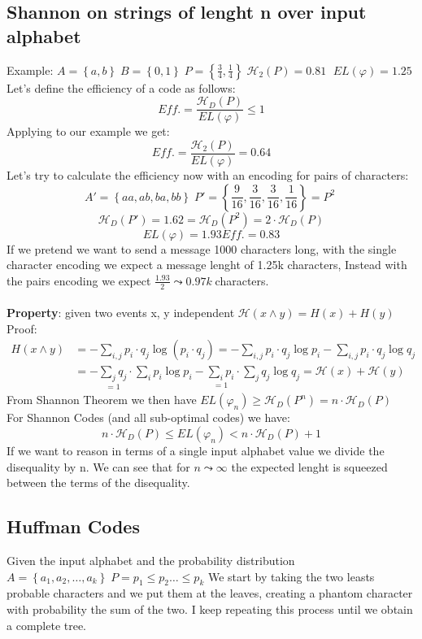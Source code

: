     \subsection*{Shannon on strings of lenght n over input alphabet}
    Example: $A=\left\{ a,b \right\} \;B=\left\{ 0,1 \right\}\; P=\left\{ \frac{3}{4}, \frac{1}{4} \right\}\; \mathcal{H}_2(P)=0.81\;$ 
    $EL(\varphi) = 1.25$\\
    Let's define the efficiency of a code as follows:
    $$Eff. = \frac{\mathcal{H}_D(P)}{EL(\varphi)}\leq 1$$
    Applying to our example we get: 
    $$Eff. = \frac{\mathcal{H}_2(P)}{EL(\varphi)}=0.64$$
    Let's try to calculate the efficiency now with an encoding for pairs of characters:
    $$A'=\left\{ aa, ab,ba,bb \right\}\; P'=\left\{ \frac{9}{16}, \frac{3}{16}, \frac{3}{16}, \frac{1}{16} \right\} = P^2 \;$$ $$
    \mathcal{H}_D(P')= 1.62 = \mathcal{H}_D(P^2) = 2\cdot \mathcal{H}_D(P)$$
    $$EL(\varphi) = 1.93 Eff. = 0.83$$
    If we pretend we want to send a message 1000 characters long, with the single character encoding we expect a message lenght of 1.25k characters,
    Instead with the pairs encoding we expect $\frac{1.93}{2} \leadsto 0.97k \;$characters.\\\\
    \textbf{Property}: given two events x, y independent
    $\mathcal{H}(x \wedge y) = H(x) + H(y)$
    Proof:
    \begin{align*}
        H(x \wedge y ) &= -\sum_{i,j}^{}{p_i \cdot q_j \log{(p_i\cdot q_j)}} = - \sum_{i,j}^{}{p_i \cdot q_j \log{p_i}} - \sum_{i,j}^{}{p_i\cdot q_j \log{q_j}}\\
        &= -\underset{=1}{\sum_{j}{q_j}} \cdot \sum_{i}^{}{p_i \log{p_i}} - \underset{=1}{\sum_{i}{p_i}} \cdot \sum_{j}{q_j \log{q_j}} = \mathcal{H}(x) + \mathcal{H}(y)
    \end{align*}
    From Shannon Theorem we then have $EL(\varphi_n) \geq \mathcal{H}_D(P^n) = n\cdot \mathcal{H}_D(P)$\\
    For Shannon Codes (and all sub-optimal codes) we have:
    $$ n\cdot \mathcal{H}_D(P) \leq EL(\varphi_n) < n\cdot \mathcal{H}_D(P)+1$$ If we want to reason in terms of a single input alphabet value
    we divide the disequality by n. We can see that for $n \leadsto \infty $ the expected lenght is squeezed between the terms of the disequality.



    \subsection*{Huffman Codes}
    Given the input alphabet and the probability distribution
    $A = \left\{ a_1, a_2, \ldots, a_k \right\} \; P={p_1\leq p_2 \ldots \leq p_k}$
    We start by taking the two leasts probable characters and we put them at the leaves, creating a phantom character with probability
    the sum of the two. I keep repeating this process until we obtain a complete tree.

